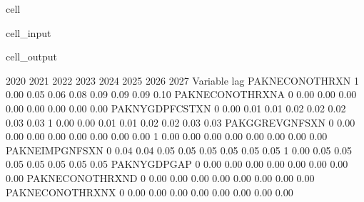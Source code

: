 \documentclass[letterpaper,10pt,english]{jupyterBook}
\begin{document}
\begin{sphinxuseclass}{cell}\begin{sphinxVerbatimInput}

\begin{sphinxuseclass}{cell_input}
\begin{sphinxVerbatim}[commandchars=\\\{\}]
\end{sphinxVerbatim}

\end{sphinxuseclass}\end{sphinxVerbatimInput}
\begin{sphinxVerbatimOutput}

\begin{sphinxuseclass}{cell_output}
\begin{sphinxVerbatim}[commandchars=\\\{\}]
                      2020  2021  2022  2023  2024  2025  2026  2027
Variable         lag                                                
PAKNECONOTHRXN   \PYGZhy{}1  \PYGZhy{}0.00  0.05  0.06  0.08  0.09  0.09  0.09  0.10
PAKNECONOTHRXN\PYGZus{}A  0  \PYGZhy{}0.00 \PYGZhy{}0.00 \PYGZhy{}0.00 \PYGZhy{}0.00 \PYGZhy{}0.00 \PYGZhy{}0.00 \PYGZhy{}0.00 \PYGZhy{}0.00
PAKNYGDPFCSTXN    0   0.00  0.01  0.01  0.02  0.02  0.02  0.03  0.03
                 \PYGZhy{}1  \PYGZhy{}0.00 \PYGZhy{}0.00 \PYGZhy{}0.01 \PYGZhy{}0.01 \PYGZhy{}0.02 \PYGZhy{}0.02 \PYGZhy{}0.03 \PYGZhy{}0.03
PAKGGREVGNFSXN    0  \PYGZhy{}0.00 \PYGZhy{}0.00 \PYGZhy{}0.00 \PYGZhy{}0.00 \PYGZhy{}0.00 \PYGZhy{}0.00 \PYGZhy{}0.00 \PYGZhy{}0.00
                 \PYGZhy{}1  \PYGZhy{}0.00 \PYGZhy{}0.00 \PYGZhy{}0.00 \PYGZhy{}0.00 \PYGZhy{}0.00 \PYGZhy{}0.00 \PYGZhy{}0.00 \PYGZhy{}0.00
PAKNEIMPGNFSXN    0   0.04  0.04  0.05  0.05  0.05  0.05  0.05  0.05
                 \PYGZhy{}1  \PYGZhy{}0.00 \PYGZhy{}0.05 \PYGZhy{}0.05 \PYGZhy{}0.05 \PYGZhy{}0.05 \PYGZhy{}0.05 \PYGZhy{}0.05 \PYGZhy{}0.05
PAKNYGDPGAP\PYGZus{}      0   0.00  0.00  0.00  0.00  0.00 \PYGZhy{}0.00 \PYGZhy{}0.00 \PYGZhy{}0.00
PAKNECONOTHRXN\PYGZus{}D  0  \PYGZhy{}0.00 \PYGZhy{}0.00 \PYGZhy{}0.00 \PYGZhy{}0.00 \PYGZhy{}0.00 \PYGZhy{}0.00 \PYGZhy{}0.00 \PYGZhy{}0.00
PAKNECONOTHRXN\PYGZus{}X  0  \PYGZhy{}0.00 \PYGZhy{}0.00 \PYGZhy{}0.00 \PYGZhy{}0.00 \PYGZhy{}0.00 \PYGZhy{}0.00 \PYGZhy{}0.00 \PYGZhy{}0.00
\end{sphinxVerbatim}

\end{sphinxuseclass}\end{sphinxVerbatimOutput}

\end{sphinxuseclass}
\end{document}
